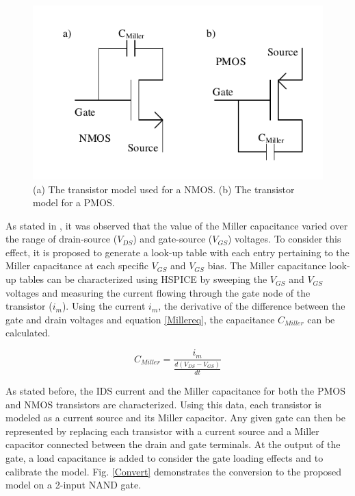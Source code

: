 \begin{figure}[!htbp]
	\centering
	\includegraphics[width=0.50\linewidth]{Figures/TransistorModel}
	\caption{(a) The transistor model used for a NMOS. (b) The transistor model for a PMOS.}
	\label{TModel}
\end{figure}

As stated in \cite{Accurate_Masking}, it was observed that the value of the Miller capacitance varied over the range of drain-source ($V_{DS}$) and gate-source ($V_{GS}$) voltages. To consider this effect, it is proposed to generate a look-up table with each entry pertaining to the Miller capacitance at each specific $V_{GS}$ and $V_{GS}$ bias. The Miller capacitance look-up tables can be characterized using HSPICE by sweeping the $V_{GS}$ and $V_{GS}$ voltages and measuring the current flowing through the gate node of the transistor ($i_m$). Using the current $i_m$, the derivative of the difference between the gate and drain voltages and equation \ref{Millereq}, the capacitance $C_{Miller}$ can be calculated.

\begin{equation}\label{Millereq}
C_{Miller} = \frac{i_m}{\frac{d(V_{DS}-V_{GS})}{dt}}
\end{equation}

As stated before, the IDS current and the Miller capacitance for both the PMOS and NMOS transistors are characterized. Using this data, each transistor is modeled as a current source and its Miller capacitor. Any given gate can then be represented by replacing each transistor with a current source and a Miller capacitor connected between the drain and gate terminals. At the output of the gate, a load capacitance is added to consider the gate loading effects and to calibrate the model. Fig. \ref{Convert} demonstrates the conversion to the proposed model on a 2-input NAND gate.

